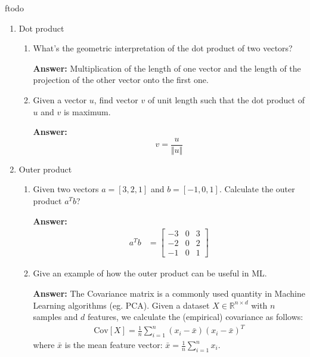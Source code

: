ƒtodo\documentclass{article}
\newenvironment{QandA}{\begin{enumerate}[label=\arabic*.]}{\end{enumerate}}
\newenvironment{InnerQandA}{\begin{enumerate}[label=\roman*.]}{\end{enumerate}}
\newenvironment{answer}{\par\normalfont \textbf{Answer:}}{}
\newcommand{\R}{\mathbb{R}}
\newcommand{\Cov}[1]{\text{Cov}\left[ #1 \right]}
\begin{document}
\begin{QandA}
    \item Dot product
    \begin{InnerQandA}
        \item What’s the geometric interpretation of the dot product of two vectors?
        \begin{answer}
            Multiplication of the length of one vector and the length of the projection of the other vector onto the first one.
        \end{answer}
        
        \item Given a vector $u$, find vector $v$ of unit length such that the dot product of $u$ and $v$ is maximum.
        \begin{answer}
            $$v = \frac{u}{\Vert u \Vert}$$
        \end{answer}
    \end{InnerQandA}

    \item Outer product
    \begin{InnerQandA}
        \item Given two vectors $a=[3,2,1]$ and $b=[-1,0,1]$. Calculate the outer product $a^T b$?  
        \begin{answer}
            \begin{align*}
                a^T b &= \begin{bmatrix}
                -3 & 0 & 3\\
                -2 & 0 & 2 \\
                -1 & 0 & 1
                \end{bmatrix}
            \end{align*}
        \end{answer}
        
        \item Give an example of how the outer product can be useful in ML.
        \begin{answer}
            The Covariance matrix is a commonly used quantity in Machine Learning algorithms (eg. PCA). Given a dataset $X \in \R^{n \times d}$ with $n$ samples and $d$ features, we calculate the (empirical) covariance as follows:
            \begin{align*}
                \Cov{X} = \frac{1}{n} \sum_{i=1}^n (x_i - \bar{x}) (x_i - \bar{x})^T
            \end{align*}
            where $\bar{x}$ is the mean feature vector: $\bar{x} = \frac{1}{n} \sum_{i=1}^n x_i$. 
        \end{answer}
    \end{InnerQandA}
    

\end{QandA}
\end{document}

